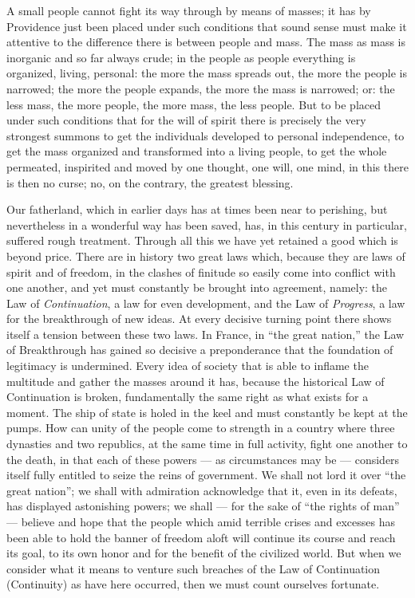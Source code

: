 \documentclass[12pt,a4paper,openany]{book}
\newcommand{\opage}[1]{\marginnote{\footnotesize\textit{[#1]}}}
\begin{document}
A small people cannot fight its way through by
means of masses; it has by Providence just been placed
under such conditions that sound sense must make it
attentive to the difference there is between
people and mass. The mass as mass is inorganic and
so far always crude; in the people as people everything is organized,
living, personal: the more the mass spreads
out, the more the people is narrowed; the more the people
expands, the more the mass is narrowed; or:
the less mass, the more people, the more mass,
the less people. But to be placed under such
conditions that for the will of spirit there is precisely the very strongest
summons to get the individuals developed
to personal independence, to get the mass organized
and transformed into a living people, to get the whole permeated, %
inspirited and moved by one thought, one will,
one mind, in this there is then no curse; no, on the contrary,
the greatest blessing.

Our fatherland, which in earlier days has at times
been near to perishing, but nevertheless in a wonderful
way has been saved, has, in this century in particular,
suffered rough treatment. Through all this we have yet
retained a good which is beyond price. There are in history
two great laws which, because they are laws of spirit and of freedom,
in the clashes of finitude so easily come
into conflict with one another, and yet must constantly be brought
into agreement, namely: the Law of \emph{Continuation},
a law for even development, and the Law of
\setcounter{footnote}{0}%
\opage{154}\emph{Progress}, a law for the breakthrough of new ideas.
At every decisive turning point there shows itself
a tension between these two laws. In France, in
``the great nation,'' the Law of Breakthrough has gained so
decisive a preponderance that the foundation of legitimacy is
undermined. Every idea of society that is able to
inflame the multitude and gather the masses around it
has, because the historical Law of Continuation is broken,
fundamentally the same right as what exists for a moment.
The ship of state is holed in the keel and must constantly be kept
at the pumps. How can unity of the people come
to strength in a country where three dynasties and two republics,
at the same time in full activity, fight one another
to the death, in that each of these powers ---
as circumstances may be --- considers itself fully entitled
to seize the reins of government. We shall
not lord it over ``the great nation''; we shall
with admiration acknowledge that it, even in its defeats,
has displayed astonishing powers; we shall --- for the sake of
``the rights of man'' --- believe and hope that
the people which amid terrible crises and excesses
has been able to hold the banner of freedom aloft will continue
its course and reach its goal, to its own honor
and for the benefit of the civilized world. But
when we consider what it means to venture such
breaches of the Law of Continuation (Continuity) as have
here occurred, then we must count ourselves fortunate.
\end{document}
